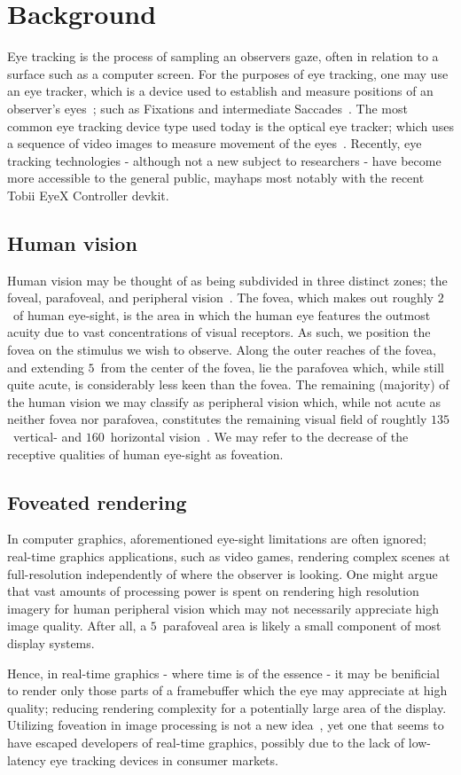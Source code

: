 \section{Background}
Eye tracking is the process of sampling an observers gaze, often in relation to a surface such as a computer screen.
For the purposes of eye tracking, one may use an eye tracker, which is a device used to establish and measure positions of an observer's eyes~\cite{duchowski07}; such as Fixations and intermediate Saccades~\cite{rayner98}.
The most common eye tracking device type used today is the optical eye tracker; which uses a sequence of video images to measure movement of the eyes~\cite{duchowski07}.
Recently, eye tracking technologies - although not a new subject to researchers - have become more accessible to the general public, mayhaps most notably with the recent Tobii EyeX Controller devkit.

\subsection{Human vision}
Human vision may be thought of as being subdivided in three distinct zones; the foveal, parafoveal, and peripheral vision~\cite{rayner98}.
The fovea, which makes out roughly $2$\degree\ of human eye-sight, is the area in which the human eye features the outmost acuity due to vast concentrations of visual receptors.
As such, we position the fovea on the stimulus we wish to observe.
Along the outer reaches of the fovea, and extending $5$\degree\ from the center of the fovea, lie the parafovea which, while still quite acute, is considerably less keen than the fovea.
The remaining (majority) of the human vision we may classify as peripheral vision which, while not acute as neither fovea nor parafovea, constitutes the remaining visual field of roughtly $135$\degree\ vertical- and $160$\degree\ horizontal vision~\cite{guenter12}.
We may refer to the decrease of the receptive qualities of human eye-sight as foveation.

\subsection{Foveated rendering}
In computer graphics, aforementioned eye-sight limitations are often ignored; real-time graphics applications, such as video games, rendering complex scenes at full-resolution independently of where the observer is looking.
One might argue that vast amounts of processing power is spent on rendering high resolution imagery for human peripheral vision which may not necessarily appreciate high image quality.
After all, a $5$\degree\ parafoveal area is likely a small component of most display systems.

Hence, in real-time graphics - where time is of the essence - it may be benificial to render only those parts of a framebuffer which the eye may appreciate at high quality; reducing rendering complexity for a potentially large area of the display.
Utilizing foveation in image processing is not a new idea~\cite{levoy90}, yet one that seems to have escaped developers of real-time graphics, possibly due to the lack of low-latency eye tracking devices in consumer markets.
